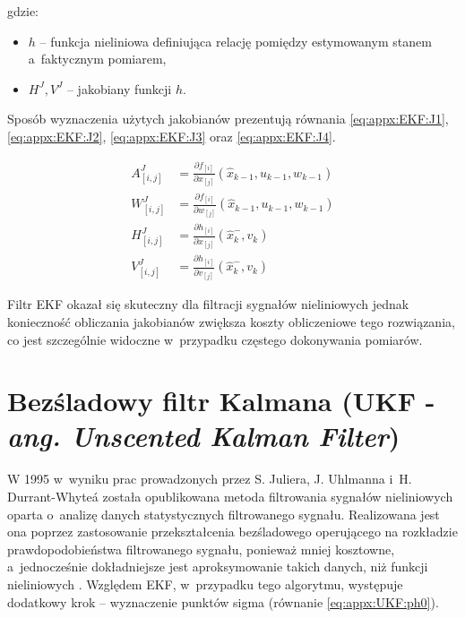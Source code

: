 gdzie:
\begin{itemize}
	\item $h$ -- funkcja nieliniowa definiująca relację pomiędzy estymowanym stanem a~faktycznym pomiarem,
	\item $H^J, V^J$ -- jakobiany funkcji $h$.
\end{itemize}
		
Sposób wyznaczenia użytych jakobianów prezentują równania \ref{eq:appx:EKF:J1}, \ref{eq:appx:EKF:J2}, \ref{eq:appx:EKF:J3} oraz \ref{eq:appx:EKF:J4}.
		
\begin{subequations}
	\begin{align}
		A^J_{[i, j]} & = \frac{\partial f_{[i]}}{\partial x_{[j]}}(\widehat{x}_{k-1}, u_{k-1}, w_{k-1}) \label{eq:appx:EKF:J1} \\
		W^J_{[i, j]} & = \frac{\partial f_{[i]}}{\partial w_{[j]}}(\widehat{x}_{k-1}, u_{k-1}, w_{k-1}) \label{eq:appx:EKF:J2} \\
		H^J_{[i, j]} & = \frac{\partial h_{[i]}}{\partial x_{[j]}}(\widehat{x}^-_k, v_k) \label{eq:appx:EKF:J3}                \\
		V^J_{[i, j]} & = \frac{\partial h_{[i]}}{\partial v_{[j]}}(\widehat{x}^-_k, v_k) \label{eq:appx:EKF:J4}                
	\end{align}
\end{subequations}
		
Filtr EKF okazał się skuteczny dla filtracji sygnałów nieliniowych jednak konieczność obliczania jakobianów zwiększa koszty obliczeniowe tego rozwiązania, co jest szczególnie widoczne w~przypadku częstego dokonywania pomiarów. 
		
		
\section*{Bezśladowy filtr Kalmana (UKF - \emph{ang. Unscented Kalman Filter})}
\label{sec:appx:filters:UKF}
W 1995 w~wyniku prac prowadzonych przez S. Juliera, J. Uhlmanna i~H. Durrant-Whyte\'a została opublikowana \cite{Julier1995} metoda filtrowania sygnałów nieliniowych oparta o~analizę danych statystycznych filtrowanego sygnału. Realizowana jest ona poprzez zastosowanie przekształcenia bezśladowego operującego na rozkładzie prawdopodobieństwa filtrowanego sygnału, ponieważ mniej kosztowne, a~jednocześnie dokładniejsze jest aproksymowanie takich danych, niż funkcji nieliniowych \cite{Uhlmann94}.
Względem EKF, w~przypadku tego algorytmu, występuje dodatkowy krok -- wyznaczenie punktów sigma (równanie \ref{eq:appx:UKF:ph0}). 
		
